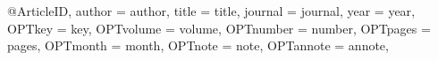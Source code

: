 \documentclass{article}
\begin{document}
\nocite{*}



@Article{ID,
	author = {author},
	title = {title},
	journal = {journal},
	year = {year},
	OPTkey = {key},
	OPTvolume = {volume},
	OPTnumber = {number},
	OPTpages = {pages},
	OPTmonth = {month},
	OPTnote = {note},
	OPTannote = {annote},
}
\end{document}
